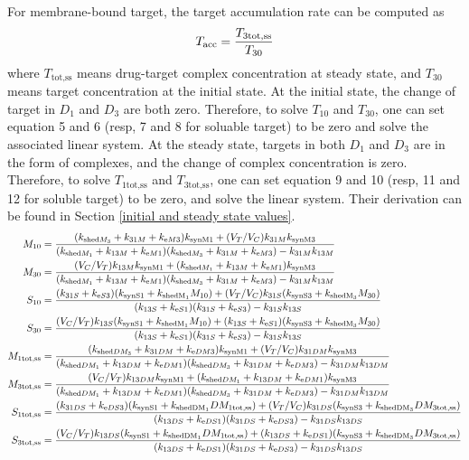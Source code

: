 For membrane-bound target, the target accumulation rate can be computed as
\[
    T_\text{acc} = \frac{T_{3\text{tot,ss}}}{T_{30}}
\]
where $T_{\text{tot,ss}}$ means drug-target complex concentration at steady state, and 
$T_{30}$ means target concentration at the initial state.
At the initial state, the change of target in $D_1$ and $D_3$ are both zero. 
Therefore, to solve $T_{10}$ and $T_{30}$, one can set equation 5 and 6 
(resp, 7 and 8 for soluable target) to be zero
and solve the associated linear system. 
At the steady state, targets in both $D_1$ and $D_3$ are 
in the form of complexes, and the change of complex concentration is zero. 
Therefore, to solve $T_{1\text{tot,ss}}$ and $T_{3\text{tot,ss}}$, one can set equation 9 and 10 (resp, 11 and 12 for soluble target)
to be zero, and solve the linear system. Their derivation can be found in Section \ref{initial and steady state values}.\\

\begin{align}
M_{10} & = \frac{(k_{\text{shed}M_3} + k_{31M} + k_{\text{e} M3})k_{\text{synM}1} + (V_{T}/V_{C})k_{31M}k_{\text{synM}3}}{(k_{\text{shed}M_1} + k_{13M} + k_{\text{e} M1})(k_{\text{shed}M_3} + k_{31M} + k_{\text{e} M3}) - k_{31M}k_{13M}}\\
M_{30} & = \frac{(V_{C}/V_{T})k_{13M}k_{\text{synM}1} + (k_{\text{shed}M_1} + k_{13M} + k_{\text{e} M1})k_{\text{synM}3}}{(k_{\text{shed}M_1} + k_{13M} + k_{\text{e} M1})(k_{\text{shed}M_3} + k_{31M} + k_{\text{e} M3}) - k_{31M}k_{13M}}\\
S_{10} & = \frac{(k_{31S} + k_{\text{e} S3})(k_{\text{synS}1} + k_{\text{shedM}_1}M_{10}) + (V_{T}/V_{C})k_{31S}(k_{\text{synS}3} + k_{\text{shedM}_3}M_{30})}{(k_{13S} + k_{\text{e} S1})(k_{31S} + k_{\text{e} S3}) - k_{31S}k_{13S}}\\
S_{30} & = \frac{(V_{C}/V_{T})k_{13S}(k_{\text{synS}1} + k_{\text{shedM}_1}M_{10}) + (k_{13S} + k_{\text{e} S1})(k_{\text{synS}3} + k_{\text{shedM}_3}M_{30})}{(k_{13S} + k_{\text{e} S1})(k_{31S} + k_{\text{e} S3}) - k_{31S}k_{13S}}\\
M_{1\text{tot,ss}} & = \frac{(k_{\text{shed}DM_3} + k_{31DM} + k_{\text{e} DM3})k_{\text{synM}1} + (V_{T}/V_{C})k_{31DM}k_{\text{synM}3}}   {(k_{\text{shed}DM_1} + k_{13DM} + k_{\text{e} DM1})(k_{\text{shed}DM_3} + k_{31DM} + k_{\text{e} DM3}) - k_{31DM}k_{13DM}}\\
M_{3\text{tot,ss}} & = \frac{(V_{C}/V_{T})k_{13DM}k_{\text{synM}1} + (k_{\text{shed}DM_1} + k_{13DM} + k_{\text{e} DM1})k_{\text{synM}3}}   {(k_{\text{shed}DM_1} + k_{13DM} + k_{\text{e} DM1})(k_{\text{shed}DM_3} + k_{31DM} + k_{\text{e} DM3}) - k_{31DM}k_{13DM}}\\
S_{1\text{tot,ss}} & = \frac{(k_{31DS} + k_{\text{e} DS3})(k_{\text{synS}1} + k_{\text{shedDM}_1}DM_{1\text{tot,ss}}) + (V_{T}/V_{C})k_{31DS}(k_{\text{synS}3} + k_{\text{shedDM}_3}DM_{3\text{tot,ss}})}   {(k_{13DS} + k_{\text{e} DS1})(k_{31DS} + k_{\text{e} DS3}) - k_{31DS}k_{13DS}}\\
S_{3\text{tot,ss}} & = \frac{(V_{C}/V_{T})k_{13DS}(k_{\text{synS}1} + k_{\text{shedDM}_1}DM_{1\text{tot,ss}}) + (k_{13DS} + k_{\text{e} DS1})(k_{\text{synS}3} + k_{\text{shedDM}_3}DM_{3\text{tot,ss}})}   {(k_{13DS} + k_{\text{e} DS1})(k_{31DS} + k_{\text{e} DS3}) - k_{31DS}k_{13DS}}
\end{align}



